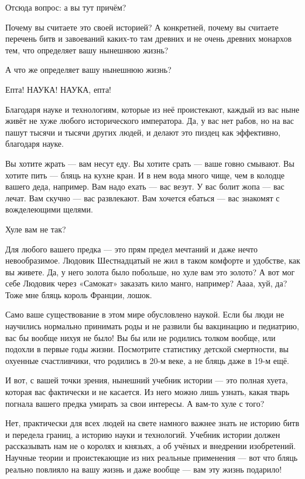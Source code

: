 Отсюда вопрос: а вы тут причём?

Почему вы считаете это своей историей? А конкретней, почему вы считаете
перечень битв и завоеваний каких-то там древних и не очень древних монархов
тем, что определяет вашу нынешнюю жизнь?

А что же определяет вашу нынешнюю жизнь? 

Епта! НАУКА! НАУКА, епта!

Благодаря науке и технологиям, которые из неё проистекают, каждый из вас ныне
живёт не хуже любого исторического императора. Да, у вас нет рабов, но на вас
пашут тысячи и тысячи других людей, и делают это пиздец как эффективно,
благодаря науке.

Вы хотите жрать — вам несут еду. Вы хотите срать — ваше говно смывают. Вы
хотите пить — бляць на кухне кран. И в нем вода много чище, чем в колодце
вашего деда, например. Вам надо ехать — вас везут. У вас болит жопа — вас
лечат. Вам скучно — вас развлекают. Вам хочется ебаться — вас знакомят с
вожделеющими щелями.

Хуле вам не так? 

Для любого вашего предка — это прям предел мечтаний и даже нечто невообразимое.
Людовик Шестнадцатый не жил в таком комфорте и удобстве, как вы живете. Да, у
него золота было побольше, но хуле вам это золото? А вот мог себе Людовик через
«Самокат» заказать кило манго, например? Аааа, хуй, да? Тоже мне бляць король
Франции, лошок.

Само ваше существование в этом мире обусловлено наукой. Если бы люди не
научились нормально принимать роды и не развили бы вакцинацию и педиатрию, вас
бы вообще нихуя не было! Вы бы или не родились толком вообще, или подохли в
первые годы жизни. Посмотрите статистику детской смертности, вы охуенные
счастливчики, что родились в 20-м веке, а не бляць даже в 19-м ещё.

И вот, с вашей точки зрения, нынешний учебник истории — это полная хуета,
которая вас фактически и не касается. Из него можно лишь узнать, какая тварь
погнала вашего предка умирать за свои интересы. А вам-то хуле с того?

Нет, практически для всех людей на свете намного важнее знать не историю битв и
передела границ, а историю науки и технологий. Учебник истории должен
рассказывать нам не о королях и князьях, а об учёных и внедрении изобретений.
Научные теории и проистекающие из них реальные применения — вот что бляць
реально повлияло на вашу жизнь и даже вообще — вам эту жизнь подарило!

